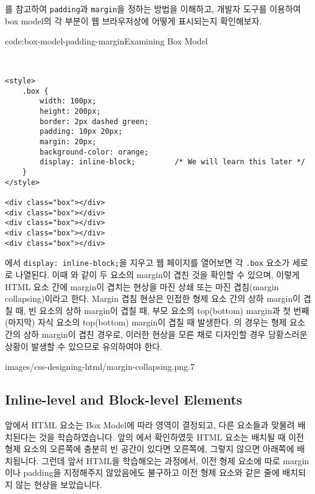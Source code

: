 를 참고하여 \texttt{padding}과 \texttt{margin}을 정하는 방법을 이해하고, 개발자 도구를 이용하여 box model의 각 부분이 웹 브라우저상에 어떻게 표시되는지 확인해보자. 

\begin{codeenv}{code:box-model-padding-margin}{Examining Box Model}\begin{verbatim}


<style>
    .box {
        width: 100px;
        height: 200px;
        border: 2px dashed green;
        padding: 10px 20px;
        margin: 20px;
        background-color: orange;
        display: inline-block;         /* We will learn this later */
    }
</style>

<div class="box"></div>
<div class="box"></div>
<div class="box"></div>
<div class="box"></div>
<div class="box"></div>
\end{verbatim}
\end{codeenv}

에서 \texttt{display: inline-block;}을 지우고 웹 페이지를 열어보면 각 \texttt{.box} 요소가 세로로 나열된다. 이때 와 같이 두 요소의 margin이 겹친 것을 확인할 수 있으며, 이렇게 HTML 요소 간에 margin이 겹치는 현상을 마진 상쇄 또는 마진 겹침(margin collapsing)이라고 한다. Margin 겹침 현상은 인접한 형제 요소 간의 상하 margin이 겹칠 때, 빈 요소의 상하 margin이 겹칠 때, 부모 요소의 top(bottom) margin과 첫 번째(마지막) 자식 요소의 top(bottom) margin이 겹칠 때 발생한다. 의 경우는 형제 요소 간의 상하 margin이 겹친 경우로, 이러한 현상을 모른 채로 디자인할 경우 당황스러운 상황이 발생할 수 있으므로 유의하여야 한다.

    {images/css-designing-html/margin-collapsing.png}{.7}

\subsection*{Inline-level and Block-level Elements}
앞에서 HTML 요소는 Box Model에 따라 영역이 결정되고, 다른 요소들과 맞물려 배치된다는 것을 학습하였습니다. 앞의 에서 확인하였듯 HTML 요소는 배치될 때 이전 형제 요소의 오른쪽에 충분히 빈 공간이 있다면 오른쪽에, 그렇지 않으면 아래쪽에 배치됩니다. 그런데 앞서 HTML을 학습해오는 과정에서, 이전 형제 요소에 따로 margin이나 padding을 지정해주지 않았음에도 불구하고 이전 형제 요소와 같은 줄에 배치되지 않는 현상을 보았습니다. 

